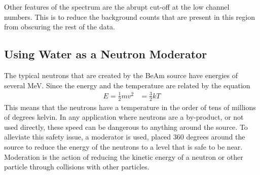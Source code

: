 Other features of the spectrum are the abrupt cut-off at the low channel numbers. This is to reduce the background counts that are present in this region from obscuring the rest of the data. 

\subsection{Using Water as a Neutron Moderator} %
\label{sub:using_water_as_a_neutron_moderator}
The typical neutrons that are created by the BeAm source have energies of several MeV. Since the energy and the temperature are related by the equation
\begin{align}
  E = \frac{1}{2}mv^2 &= \frac{3}{2}kT
\end{align}
This means that the neutrons have a temperature in the order of tens of millions of degrees kelvin. In any application where neutrons are a by-product, or not used directly, these speed can be dangerous to anything around the source. To alleviate this safety issue, a moderator is used, placed 360 degrees around the source to reduce the energy of the neutrons to a level that is safe to be near. Moderation is the action of reducing the kinetic energy of a neutron or other particle through collisions with other particles. 

